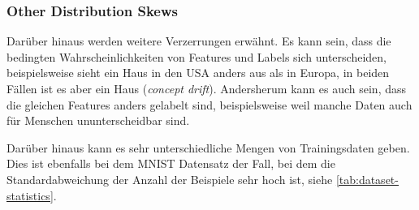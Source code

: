 \subsubsection{Other Distribution Skews}
Darüber hinaus werden weitere Verzerrungen erwähnt. Es kann sein, dass die bedingten Wahrscheinlichkeiten von Features und Labels sich unterscheiden, beispielsweise sieht ein Haus in den USA anders aus als in Europa, in beiden Fällen ist es aber ein Haus (\textit{concept drift}). Andersherum kann es auch sein, dass die gleichen Features anders gelabelt sind, beispielsweise weil manche Daten auch für Menschen ununterscheidbar sind.

Darüber hinaus kann es sehr unterschiedliche Mengen von Trainingsdaten geben. Dies ist ebenfalls bei dem MNIST Datensatz der Fall, bei dem die Standardabweichung der Anzahl der Beispiele sehr hoch ist, siehe \autoref{tab:dataset-statistics}.


